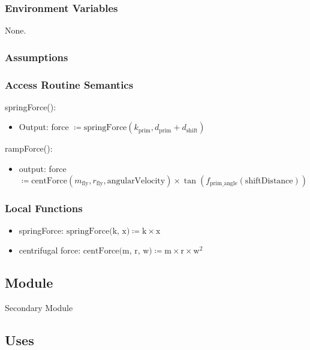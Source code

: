 \documentclass[12pt, titlepage]{article}
\begin{document}
\subsubsection{Environment Variables}
None.

\subsubsection{Assumptions}

\subsubsection{Access Routine Semantics}

\noindent springForce():
\begin{itemize}
  \item Output: force $\coloneq \text{springForce} (k_{\text{prim}}, d_{\text{prim}} + d_{\text{shift}})$
\end{itemize}

\noindent rampForce():
\begin{itemize}
\item output: force $\coloneq \text{centForce}(m_\text{fly}, r_{\text{fly}}, \text{angularVelocity}) \times \tan(f_{\text{prim\_angle}}(\text{shiftDistance})) $
\end{itemize}

\subsubsection{Local Functions}

\begin{itemize}
  \item springForce: $\text{springForce(k, x)} \coloneq \text{k} \times \text{x}$
  \item centrifugal force: $\text{centForce(m, r, w)} \coloneq \text{m} \times \text{r} \times \text{w}^2$
\end{itemize}
\newpage



\subsection{Module}

Secondary Module

\subsection{Uses}
\end{document}
